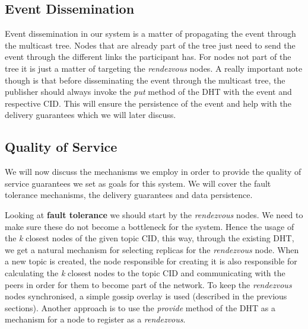 \subsection{Event Dissemination}\label{event-dissemination}

Event dissemination in our system is a matter of propagating the event
through the multicast tree. Nodes that are already part of the tree just
need to send the event through the different links the participant has.
For nodes not part of the tree it is just a matter of targeting the
\emph{rendezvous} nodes. A really important note though is that before
disseminating the event through the multicast tree, the publisher should
always invoke the \emph{put} method of the DHT with the event and
respective CID. This will ensure the persistence of the event and help
with the delivery guarantees which we will later discuss.

\subsection{Quality of Service}\label{quality-of-service}

We will now discuss the mechanisms we employ in order to provide the
quality of service guarantees we set as goals for this system. We will
cover the fault tolerance mechanisms, the delivery guarantees and data
persistence.

Looking at \textbf{fault tolerance} we should start by the
\emph{rendezvous} nodes. We need to make sure these do not become a
bottleneck for the system. Hence the usage of the \emph{k} closest nodes
of the given topic CID, this way, through the existing DHT, we get a
natural mechanism for selecting replicas for the \emph{rendezvous} node.
When a new topic is created, the node responsible for creating it is
also responsible for calculating the \emph{k} closest nodes to the topic
CID and communicating with the peers in order for them to become part of
the network. To keep the \emph{rendezvous} nodes synchronised, a simple
gossip overlay is used (described in the previous sections). Another
approach is to use the \emph{provide} method of the DHT as a mechanism
for a node to register as a \emph{rendezvous}.

